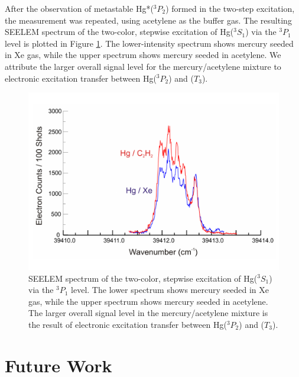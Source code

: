 After the observation of metastable Hg*($^3P_2$) formed in the
two-step excitation, the measurement was repeated, using acetylene as
the buffer gas.  The resulting SEELEM spectrum of the two-color,
stepwise excitation of Hg($^3S_1$) via the $^3P_1$ level is plotted in
Figure \ref{fig:hg-twostep-c2h2}.  The lower-intensity spectrum shows
mercury seeded in Xe gas, while the upper spectrum shows mercury
seeded in acetylene.  We attribute the larger overall signal level for
the mercury/acetylene mixture to electronic excitation transfer
between Hg($^3P_2$) and ($T_3$).

\begin{figure}
  \caption{SEELEM spectrum of the two-color, stepwise excitation of
    Hg($^3S_1$) via the $^3P_1$ level.  The lower spectrum shows
    mercury seeded in Xe gas, while the upper spectrum shows mercury
    seeded in acetylene.  The larger overall signal level in the
    mercury/acetylene mixture is the result of electronic excitation
    transfer between Hg($^3P_2$) and ($T_3$).}
  \label{fig:hg-twostep-c2h2}
  \centering
  \includegraphics[width=8in,angle=90]{hg-twostep-c2h2.pdf}
\end{figure}


\section{Future Work}

